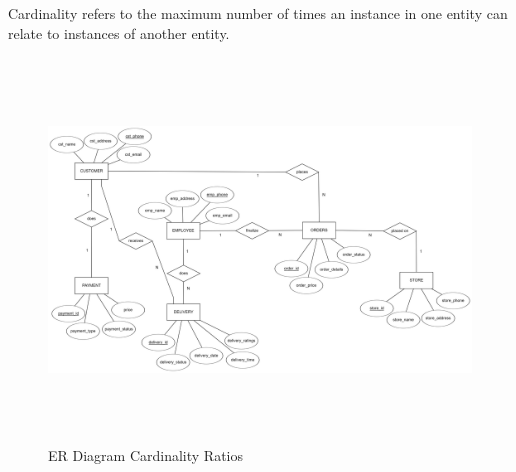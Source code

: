 \documentclass[12pt,a4paper]{report}
\begin{document}
Cardinality refers to the maximum number of times an instance in one entity can relate to instances of another entity.\
\begin{figure}[hbtp]
\begin{center}
\includegraphics[width=6in,height=4in]{../fig/cardi}
\end{center}
\caption{ER Diagram Cardinality Ratios}
\end{figure}



\newpage
\end{document}
